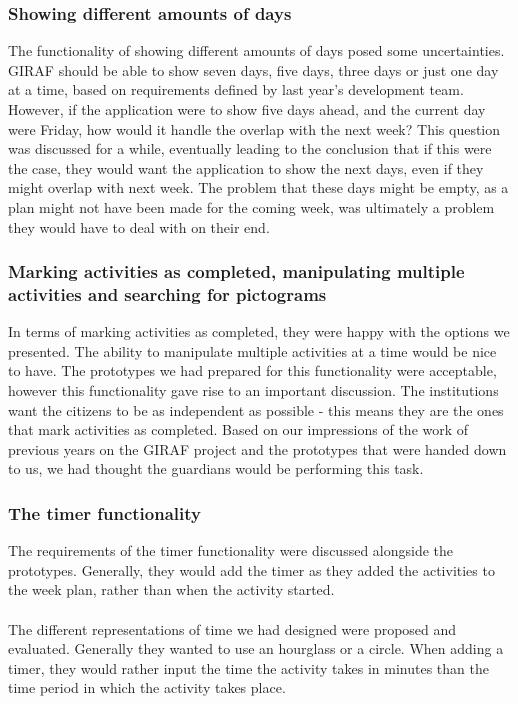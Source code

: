 \subsubsection{Showing different amounts of days}
The functionality of showing different amounts of days posed some uncertainties.
GIRAF should be able to show seven days, five days, three days or just one day at a time, based on requirements defined by last year's development team.
However, if the application were to show five days ahead, and the current day were Friday, how would it handle the overlap with the next week?
This question was discussed for a while, eventually leading to the conclusion that if this were the case, they would want the application to show the next days, even if they might overlap with next week.
The problem that these days might be empty, as a plan might not have been made for the coming week, was ultimately a problem they would have to deal with on their end.

\subsubsection{Marking activities as completed, manipulating multiple activities and searching for pictograms}
In terms of marking activities as completed, they were happy with the options we presented.
The ability to manipulate multiple activities at a time would be nice to have.
The prototypes we had prepared for this functionality were acceptable, however this functionality gave rise to an important discussion.
The institutions want the citizens to be as independent as possible - this means they are the ones that mark activities as completed.
Based on our impressions of the work of previous years on the GIRAF project and the prototypes that were handed down to us, we had thought the guardians would be performing this task.

\subsubsection{The timer functionality}
The requirements of the timer functionality were discussed alongside the prototypes.
Generally, they would add the timer as they added the activities to the week plan, rather than when the activity started.
\\\\
The different representations of time we had designed were proposed and evaluated.
Generally they wanted to use an hourglass or a circle.
When adding a timer, they would rather input the time the activity takes in minutes than the time period in which the activity takes place.

